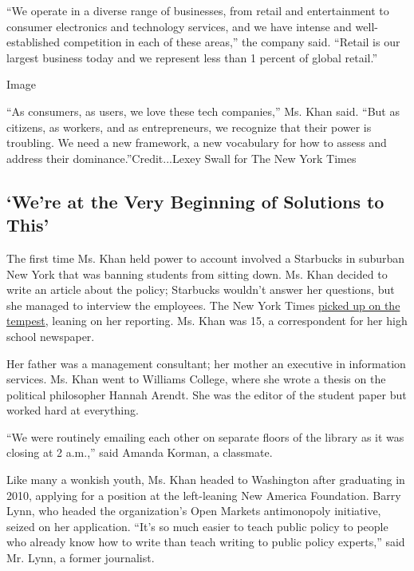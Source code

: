 ``We operate in a diverse range of businesses, from retail and
entertainment to consumer electronics and technology services, and we
have intense and well-established competition in each of these areas,''
the company said. ``Retail is our largest business today and we
represent less than 1 percent of global retail.''

Image

``As consumers, as users, we love these tech companies,'' Ms. Khan said.
``But as citizens, as workers, and as entrepreneurs, we recognize that
their power is troubling. We need a new framework, a new vocabulary for
how to assess and address their dominance.''Credit...Lexey Swall for The
New York Times

\hypertarget{were-at-the-very-beginning-of-solutions-to-this}{%
\subsection{`We're at the Very Beginning of Solutions to
This'}\label{were-at-the-very-beginning-of-solutions-to-this}}

The first time Ms. Khan held power to account involved a Starbucks in
suburban New York that was banning students from sitting down. Ms. Khan
decided to write an article about the policy; Starbucks wouldn't answer
her questions, but she managed to interview the employees. The New York
Times
\href{https://www.nytimes3xbfgragh.onion/2004/10/17/nyregion/education/a-tempest-in-a-coffee-shop.html}{picked
up on the tempest}, leaning on her reporting. Ms. Khan was 15, a
correspondent for her high school newspaper.

Her father was a management consultant; her mother an executive in
information services. Ms. Khan went to Williams College, where she wrote
a thesis on the political philosopher Hannah Arendt. She was the editor
of the student paper but worked hard at everything.

``We were routinely emailing each other on separate floors of the
library as it was closing at 2 a.m.,'' said Amanda Korman, a classmate.

Like many a wonkish youth, Ms. Khan headed to Washington after
graduating in 2010, applying for a position at the left-leaning New
America Foundation. Barry Lynn, who headed the organization's Open
Markets antimonopoly initiative, seized on her application. ``It's so
much easier to teach public policy to people who already know how to
write than teach writing to public policy experts,'' said Mr. Lynn, a
former journalist.

